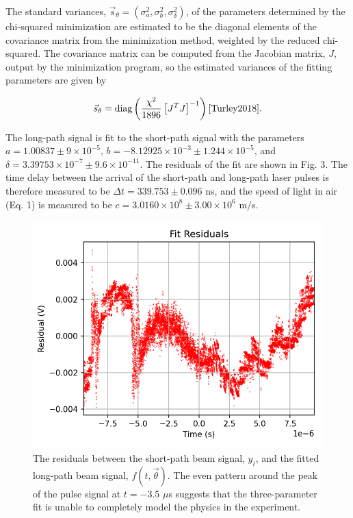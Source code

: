 \documentclass[%
 reprint,
 amsmath,amssymb,
 aps,
]{revtex4-2}
\begin{document}
\noindent The standard variances, $\vec{s}_\theta=(\sigma_a^2, \sigma_b^2, \sigma_{\delta}^2)$, of the parameters determined by the chi-squared minimization are estimated to be the diagonal elements of the covariance matrix from the minimization method, weighted by the reduced chi-squared. The covariance matrix can be computed from the Jacobian matrix, $J$, output by the minimization program, so the estimated variances of the fitting parameters are given by

\begin{equation}
    \vec{s}_\theta = \text{diag}\left(\frac{\chi^2}{1896} \left[J^T J \right]^{-1}  \right) \cite{Turley2018}.
\end{equation}

The long-path signal is fit to the short-path signal with the parameters $a = 1.00837 \pm 9 \times 10^{-5}$, $b = -8.12925 \times 10^{-3} \pm  1.244 \times 10^{-5} $, and $\delta = 3.39753 \times 10^{-7 } \pm  9.6 \times 10^{-11}$. The residuals of the fit are shown in Fig. 3. The time delay between the arrival of the short-path and long-path laser pulses is therefore measured to be $\Delta t = 339.753 \pm 0.096$ ns, and the speed of light in air (Eq. 1) is measured to be $c = 3.0160 \times 10^8 \pm 3.00 \times 10^6$ m/s.

\begin{figure}[H]
    \centering
    \includegraphics[width=0.9\columnwidth]{Residuals.png}%
    \caption{\label{fig:epsart} The residuals between the short-path beam signal, $y_i$, and the fitted long-path beam signal, $f(t, \vec{\theta})$. The even pattern around the peak of the pulse signal at $t = -3.5$ $\mu$s suggests that the three-parameter fit is unable to completely model the physics in the experiment.}
    \end{figure}
\end{document}

